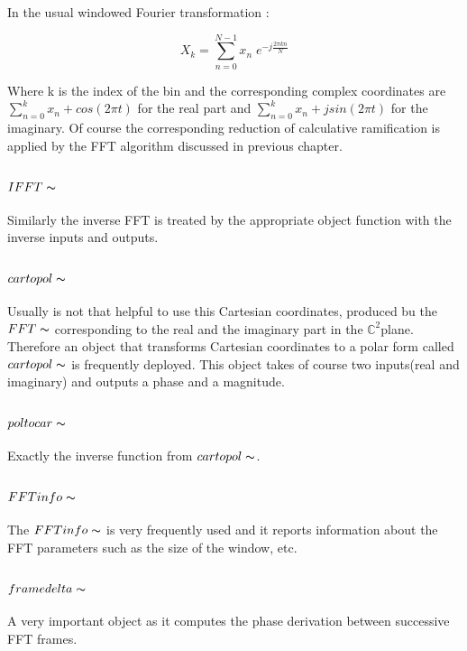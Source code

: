     In the usual windowed Fourier transformation :

    \begin{equation}
        X_k = \sum_{n=0}^{N-1} x_n \; e^{-j \frac{2 \pi k n}{N}}
    \end{equation}

    Where k is the index of the bin and the corresponding complex coordinates are $\sum_{n=0}^k x_n + cos(2 \pi t) $ for the real part and $\sum_{n=0}^k x_n + j sin(2 \pi t)$ for the imaginary. Of course the corresponding reduction of calculative ramification is applied by the FFT algorithm discussed in previous chapter.


\subsubsection{$IFFT\thicksim$}
    Similarly the inverse FFT is treated by the appropriate object function with the inverse inputs and outputs.

\subsubsection{$cartopol\thicksim$}
    Usually is not that helpful to use this Cartesian coordinates, produced bu the $FFT\thicksim$ corresponding to the real and the imaginary part in the $\mathbb{C}^2$plane. Therefore an object that transforms Cartesian coordinates to a polar form called $cartopol\thicksim$ is frequently deployed. This object takes of course two inputs(real and imaginary) and outputs a phase and a magnitude.

\subsubsection{$poltocar\thicksim$}
    Exactly the inverse function from $cartopol\thicksim$.

\subsubsection{$FFTinfo\thicksim$}
    The $FFTinfo\thicksim$ is very frequently used and it reports information about the FFT parameters such as the size of the window, etc.
\subsubsection{$framedelta\thicksim$}
    A very important object as it computes the phase derivation between successive FFT frames. 

